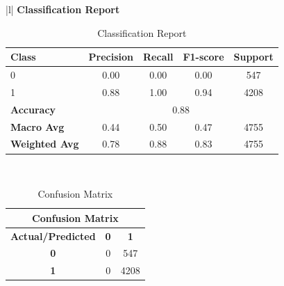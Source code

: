 \begin{table}[H]
    \centering
    
    \begin{tabular}{|l|}
    \hline
    \textbf{Classification Report} \\
    \hline
    \begin{tabular}{|l|c|c|c|c|}
    \hline
    \textbf{Class} & \textbf{Precision} & \textbf{Recall} & \textbf{F1-score} & \textbf{Support} \\ \hline
    0              & 0.00               & 0.00            & 0.00              & 547              \\ \hline
    1              & 0.88               & 1.00            & 0.94              & 4208             \\ \hline
    \textbf{Accuracy} & \multicolumn{4}{c|}{0.88}                                \\ \hline
    \textbf{Macro Avg} & 0.44              & 0.50            & 0.47              & 4755             \\ \hline
    \textbf{Weighted Avg} & 0.78             & 0.88            & 0.83              & 4755             \\ \hline
    \end{tabular} \\
    \hline
    \end{tabular}
    \caption{Classification Report}
    \label{table:classification_report}
\end{table}

\begin{table}[H]
    \centering
   
    \begin{tabular}{|c|c|c|}
    \hline
    \multicolumn{3}{|c|}{\textbf{Confusion Matrix}} \\
    \hline
    \textbf{Actual/Predicted} & \textbf{0} & \textbf{1} \\ \hline
    \textbf{0} & 0 & 547 \\ \hline
    \textbf{1} & 0 & 4208 \\ \hline
    \end{tabular}
    \caption{Confusion Matrix}
    \label{table:confusion_matrix}
\end{table}



